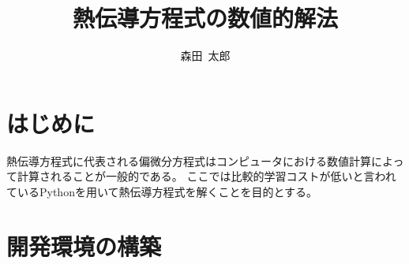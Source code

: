 \documentclass[]{article}
\title{熱伝導方程式の数値的解法}
\author{森田~太郎}
\date{}
\begin{document}
	\maketitle
	\section{はじめに}
	熱伝導方程式に代表される偏微分方程式はコンピュータにおける数値計算によって計算されることが一般的である。
	ここでは比較的学習コストが低いと言われているPythonを用いて熱伝導方程式を解くことを目的とする。

	\section{開発環境の構築}
\end{document}
